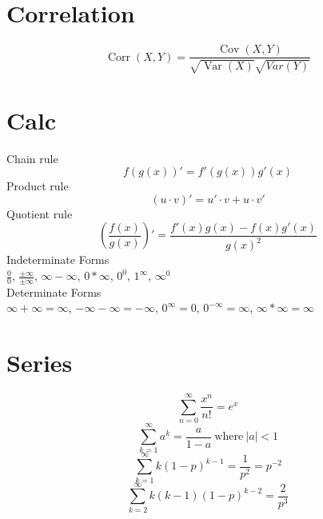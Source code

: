 \documentclass[twocolumn]{amsart}
\newcommand{\Cov}{\operatorname{Cov}}
\newcommand{\Corr}{\operatorname{Corr}}
\newcommand{\Var}{\operatorname{Var}}
\begin{document}
\section*{Correlation}
\begin{equation*}
  \Corr(X, Y) = \frac{\Cov(X, Y)}{\sqrt{\Var(X)}\sqrt{Var(Y)}}
\end{equation*}


\section*{Calc}
Chain rule
\begin{equation*}
  f(g(x))' = f'(g(x))g'(x)
\end{equation*}
Product rule
\begin{equation*}
  (u \cdot v)' = u' \cdot v + u \cdot v'
\end{equation*}
Quotient rule
\begin{equation*}
  \left(\frac{f(x)}{g(x)}\right)' = \frac{f'(x)g(x) - f(x)g'(x)}{g(x)^2}
\end{equation*}
Indeterminate Forms \\
$\frac{0}{0}$, $\frac{\pm\infty}{\pm\infty}$, $\infty-\infty$, $0*\infty$,
$0^{0}$, $1^{\infty}$, $\infty^{0}$ \\
Determinate Forms \\
$\infty+\infty=\infty$, $-\infty-\infty=-\infty$, $0^{\infty}=0$,
$0^{-\infty}=\infty$, $\infty*\infty=\infty$

\section*{Series}
\begin{equation*}
  \sum_{n=0}^{\infty}\frac{x^{n}}{n!} = e^{x}
\end{equation*}
\begin{equation*}
  \sum_{k=1}^{\infty}{a^{k}}=\frac{a}{1-a}~\text{where}~|a|<1
\end{equation*}
\begin{equation*}
  \sum_{k=1}^{\infty}k(1-p)^{k-1}=\frac{1}{p^{2}}=p^{-2}
\end{equation*}
\begin{equation*}
  \sum_{k=2}^{\infty}k(k-1)(1-p)^{k-2}=\frac{2}{p^{3}}
\end{equation*}
\end{document}
